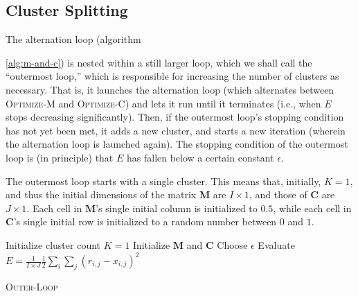\subsection{Cluster Splitting}
\label{sec:cl-split}
The alternation loop (algorithm~{\ref{alg:m-and-c}) is nested within a still larger loop, which we shall call the ``outermost loop,'' which is responsible for increasing the number of clusters as necessary. That is, it launches the alternation loop (which alternates between \textsc{Optimize-M} and \textsc{Optimize-C}) and lets it run until it terminates (i.e., when $E$ stops decreasing significantly). Then, if the outermost loop's stopping condition has not yet been met, it adds a new cluster, and starts a new iteration (wherein the alternation loop is launched again). The stopping condition of the outermost loop is (in principle) that $E$ has fallen below a certain constant $\epsilon$.

 The outermost loop starts with a single cluster. This means that, initially, 
 $K = 1$, and thus the initial dimensions of the matrix $\textbf{M}$ are 
 $I \times 1$, and those of $\textbf{C}$ are $J \times 1$. Each cell in $\textbf{M}$'s 
 single initial column is initialized to $0.5$, while each cell in $\textbf{C}$'s 
 single initial row is initialized to a random number between $0$ and $1$.  

\begin{algorithm}[t]
Initialize cluster count $K = 1$\;
Initialize $\textbf{M}$ and $\textbf{C}$\;
Choose $\epsilon$\;
Evaluate $E = \frac{1}{I\times J} \frac{1}{2} \sum_i \sum_j (r_{i,j} - x_{i,j})^2$\;\label{line:init-E}
\caption{\textsc{Outer-Loop}}
\label{alg:outer-loop}
\end{algorithm}

}
